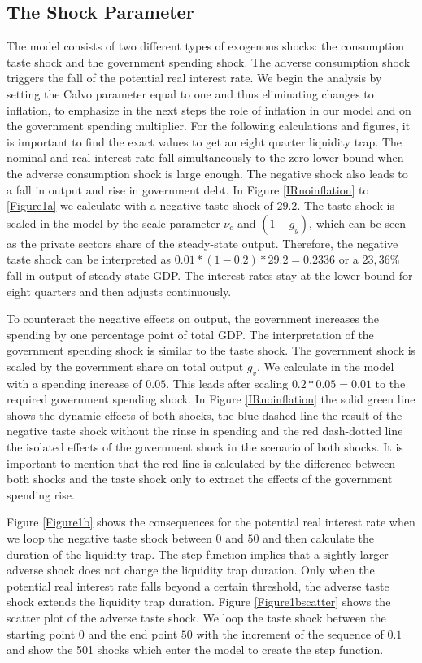 \documentclass[12pt,a4paper,oneside,titlepage]{article}
\begin{document}
\subsection*{The Shock Parameter}
The model consists of two different types of exogenous shocks: the consumption taste shock and the government spending shock. The adverse consumption shock triggers the fall of the potential real interest rate. We begin the analysis by setting the Calvo parameter equal to one and thus eliminating changes to inflation, to emphasize in the next steps the role of inflation in our model and on the government spending multiplier. For the following calculations and figures, it is important to find the exact values to get an eight quarter liquidity trap. The nominal and real interest rate fall simultaneously to the zero lower bound when the adverse consumption shock is large enough. The negative shock also leads to a fall in output and rise in government debt. In Figure \ref{IRnoinflation} to \ref{Figure1a} we calculate with a negative taste shock of $29.2$. The taste shock is scaled in the model by the scale parameter $\nu_c$ and $\left(1- g_y\right)$, which can be seen as the private sectors share of the steady-state output. Therefore, the negative taste shock can be interpreted as $0.01 * \left(1-0.2\right) * 29.2 = 0.2336$ or a $23,36\%$ fall in output of steady-state GDP. The interest rates stay at the lower bound for eight quarters and then adjusts continuously.
\par
\bigskip
To counteract the negative effects on output, the government increases the spending by one percentage point of total GDP. The interpretation of the government spending shock is similar to the taste shock.  The government shock is scaled by the government share on total output $g_v$. We calculate in the model with a spending increase of $0.05$. This leads after scaling $0.2 * 0.05 = 0.01$ to the required government spending shock.
In Figure \ref{IRnoinflation} the solid green line shows the dynamic effects of both shocks, the blue dashed line the result of the negative taste shock without the rinse in spending and the red dash-dotted line the isolated effects of the government shock in the scenario of both shocks. It is important to mention that the red line is calculated by the difference between both shocks and the taste shock only to extract the effects of the government spending rise.
\par
\bigskip
Figure \ref{Figure1b} shows the consequences for the potential real interest rate when we loop the negative taste shock between $0$ and $50$ and then calculate the duration of the liquidity trap. The step function implies that a sightly larger adverse shock does not change the liquidity trap duration. Only when the potential real interest rate falls beyond a certain threshold, the adverse taste shock extends the liquidity trap duration. Figure \ref{Figure1bscatter} shows the scatter plot of the adverse taste shock. We loop the taste shock between the starting point $0$ and the end point $50$ with the increment of the sequence of $0.1$ and show the 501 shocks which enter the model to create the step function.
\end{document}
